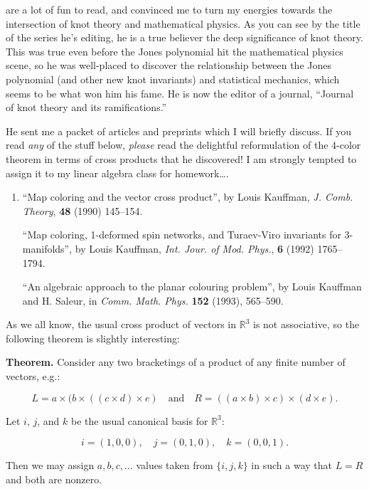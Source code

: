 \documentclass{article}
\begin{document}
are a lot of fun to read, and convinced me to turn my energies towards
the intersection of knot theory and mathematical physics. As you can see
by the title of the series he's editing, he is a true believer the deep
significance of knot theory. This was true even before the Jones
polynomial hit the mathematical physics scene, so he was well-placed to
discover the relationship between the Jones polynomial (and other new
knot invariants) and statistical mechanics, which seems to be what won
him his fame. He is now the editor of a journal, ``Journal of knot
theory and its ramifications.''

He sent me a packet of articles and preprints which I will briefly
discuss. If you read \emph{any} of the stuff below, \emph{please} read
the delightful reformulation of the 4-color theorem in terms of cross
products that he discovered! I am strongly tempted to assign it to my
linear algebra class for homework\ldots.

\begin{enumerate}
\def\labelenumi{\arabic{enumi})}
\item
  ``Map coloring and the vector cross product'', by Louis Kauffman,
  \emph{J. Comb. Theory}, \textbf{48} (1990) 145--154.

  ``Map coloring, 1-deformed spin networks, and Turaev-Viro invariants
  for 3-manifolds'', by Louis Kauffman, \emph{Int. Jour. of Mod. Phys.},
  \textbf{6} (1992) 1765--1794.

  ``An algebraic approach to the planar colouring problem'', by Louis
  Kauffman and H. Saleur, in \emph{Comm. Math. Phys.} \textbf{152}
  (1993), 565--590.
\end{enumerate}

As we all know, the usual cross product of vectors in \(\mathbb{R}^3\)
is not associative, so the following theorem is slightly interesting:

\textbf{Theorem.} Consider any two bracketings of a product of any
finite number of vectors, e.g.:

\[L = a \times (b \times ((c \times d) \times e) \quad\text{and}\quad  R = ((a \times b) \times c) \times (d \times e).\]

Let \(i\), \(j\), and \(k\) be the usual canonical basis for
\(\mathbb{R}^3\):

\[i = (1,0,0), \quad j = (0,1,0), \quad k = (0,0,1).\]

Then we may assign \(a,b,c,\ldots\) values taken from \(\{i,j,k\}\) in
such a way that \(L = R\) and both are nonzero.
\end{document}
